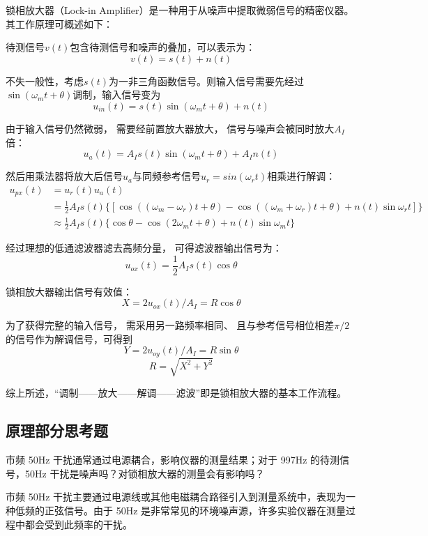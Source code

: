 \documentclass[dvipsnames, svgnames,a4paper,11pt]{article}
\begin{document}
	锁相放大器（Lock-in Amplifier）是一种用于从噪声中提取微弱信号的精密仪器。其工作原理可概述如下：

	待测信号$v(t)$包含待测信号和噪声的叠加，可以表示为：
	\[
		v(t) = s(t) + n(t)
 	\]
	
	不失一般性，考虑$s(t)$为一非三角函数信号。则输入信号需要先经过$\sin(\omega_m t + \theta)$调制，输入信号变为
	\[
		u_{in}(t) = s(t)\sin(\omega_m t + \theta) + n(t)
	\]

	由于输入信号仍然微弱， 需要经前置放大器放大， 信号与噪声会被同时放大$A_I$倍：
	\[
		u_{a}(t) = A_I s(t)\sin(\omega_m t + \theta) + A_I n(t)
	\]

	然后用乘法器将放大后信号$u_{a}$与同频参考信号$u_{r} = sin(\omega_r t)$相乘进行解调：
	\begin{align*}
		u_{px}(t) &= u_{r}(t) u_{a}(t) \\
		&= \frac{1}{2} A_I s(t) \{ [ \cos((\omega_m - \omega_r)t + \theta) - \cos((\omega_m + \omega_r)t + \theta) + n(t)\sin\omega_r t ]\} \\
		&\approx \frac{1}{2} A_I s(t)\{ \cos\theta - \cos(2\omega_m t + \theta) + n(t)\sin\omega_m t\}
	\end{align*}

	经过理想的低通滤波器滤去高频分量， 可得滤波器输出信号为：
	\[
		u_{ox}(t) = \frac{1}{2} A_I s(t) \cos\theta
	\]

	锁相放大器输出信号有效值：
	\[
		X = 2 u_{ox}(t) / A_I = R \cos \theta
	\]

	为了获得完整的输入信号， 需采用另一路频率相同、 且与参考信号相位相差$\pi/2$的信号作为解调信号，可得到
	\[
		Y = 2 u_{oy}(t) / A_I = R \sin \theta
	\]
	\[
		R = \sqrt{X^2 + Y^2}
	\]

	综上所述，“调制——放大——解调——滤波”即是锁相放大器的基本工作流程。







	




\subsection{原理部分思考题}

\begin{question}
	市频 50Hz 干扰通常通过电源耦合，影响仪器的测量结果；对于 997Hz 的待测信号，50Hz 干扰是噪声吗？对锁相放大器的测量会有影响吗？
\end{question}

市频 50Hz 干扰主要通过电源线或其他电磁耦合路径引入到测量系统中，表现为一种低频的正弦信号。由于 50Hz 是非常常见的环境噪声源，许多实验仪器在测量过程中都会受到此频率的干扰。
\end{document}
